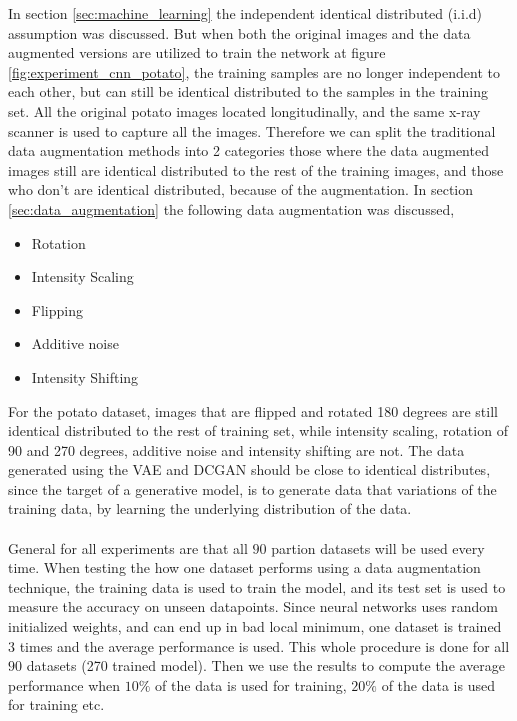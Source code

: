 \documentclass[11pt]{article}
\begin{document}
In section \ref{sec:machine_learning} the independent identical distributed (i.i.d) assumption was discussed. But when both the original images and the data augmented versions are utilized to train the network at figure \ref{fig:experiment_cnn_potato}, the training samples are no longer independent to each other, but can still be identical distributed to the samples in the training set. All the original potato images located longitudinally, and the same x-ray scanner is used to capture all the images. Therefore we can split the traditional data augmentation methods into 2 categories those where the data augmented images still are identical distributed to the rest of the training images, and those who don't are identical distributed, because of the augmentation. In section \ref{sec:data_augmentation} the following data augmentation was discussed,
\begin{itemize}
    \item Rotation
    \item Intensity Scaling
    \item Flipping
    \item Additive noise
    \item Intensity Shifting
\end{itemize}
For the potato dataset, images that are flipped and rotated 180 degrees are still identical distributed to the rest of training set, while intensity scaling, rotation of 90 and 270 degrees, additive noise and intensity shifting are not. The data generated using the VAE and DCGAN should be close to identical distributes, since the target of a generative model, is to generate data that variations of the training data, by learning the underlying distribution of the data. 
\\ \\
General for all experiments are that all $90$ partion datasets will be used every time. When testing the how one dataset performs using a data augmentation technique, the training data is used to train the model, and its test set is used to measure the accuracy on unseen datapoints. Since neural networks uses random initialized weights, and can end up in bad local minimum, one dataset is trained 3 times and the average performance is used. This whole procedure is done for all $90$ datasets (270 trained model). Then we use the results to compute the average performance when $10\%$ of the data is used for training, $20 \%$ of the data is used for training etc.
\\ \\
\end{document}
